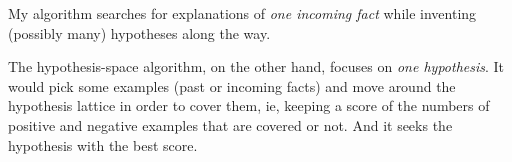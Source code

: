 \begin{compactenum}[\textbullet ]
\item  My algorithm searches for explanations of \textit{one incoming fact} while inventing (possibly many) hypotheses along the way.

\item  The hypothesis-space algorithm, on the other hand, focuses on \textit{one hypothesis}.  It would pick some examples (past or incoming facts) and move around the hypothesis lattice in order to cover them, ie, keeping a score of the numbers of positive and negative examples that are covered or not.  And it seeks the hypothesis with the best score.\\
\end{compactenum}




